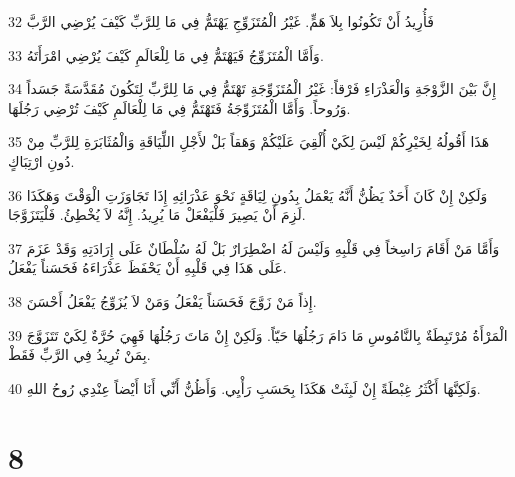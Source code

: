 \par 32 فَأُرِيدُ أَنْ تَكُونُوا بِلاَ هَمٍّ. غَيْرُ الْمُتَزَوِّجِ يَهْتَمُّ فِي مَا لِلرَّبِّ كَيْفَ يُرْضِي الرَّبَّ
\par 33 وَأَمَّا الْمُتَزَوِّجُ فَيَهْتَمُّ فِي مَا لِلْعَالَمِ كَيْفَ يُرْضِي امْرَأَتَهُ.
\par 34 إِنَّ بَيْنَ الزَّوْجَةِ وَالْعَذْرَاءِ فَرْقاً: غَيْرُ الْمُتَزَوِّجَةِ تَهْتَمُّ فِي مَا لِلرَّبِّ لِتَكُونَ مُقَدَّسَةً جَسَداً وَرُوحاً. وَأَمَّا الْمُتَزَوِّجَةُ فَتَهْتَمُّ فِي مَا لِلْعَالَمِ كَيْفَ تُرْضِي رَجُلَهَا.
\par 35 هَذَا أَقُولُهُ لِخَيْرِكُمْ لَيْسَ لِكَيْ أُلْقِيَ عَلَيْكُمْ وَهَقاً بَلْ لأَجْلِ اللِّيَاقَةِ وَالْمُثَابَرَةِ لِلرَّبِّ مِنْ دُونِ ارْتِبَاكٍ.
\par 36 وَلَكِنْ إِنْ كَانَ أَحَدٌ يَظُنُّ أَنَّهُ يَعْمَلُ بِدُونِ لِيَاقَةٍ نَحْوَ عَذْرَائِهِ إِذَا تَجَاوَزَتِ الْوَقْتَ وَهَكَذَا لَزِمَ أَنْ يَصِيرَ فَلْيَفْعَلْ مَا يُرِيدُ. إِنَّهُ لاَ يُخْطِئُ. فَلْيَتَزَوَّجَا.
\par 37 وَأَمَّا مَنْ أَقَامَ رَاسِخاً فِي قَلْبِهِ وَلَيْسَ لَهُ اضْطِرَارٌ بَلْ لَهُ سُلْطَانٌ عَلَى إِرَادَتِهِ وَقَدْ عَزَمَ عَلَى هَذَا فِي قَلْبِهِ أَنْ يَحْفَظَ عَذْرَاءَهُ فَحَسَناً يَفْعَلُ.
\par 38 إِذاً مَنْ زَوَّجَ فَحَسَناً يَفْعَلُ وَمَنْ لاَ يُزَوِّجُ يَفْعَلُ أَحْسَنَ.
\par 39 الْمَرْأَةُ مُرْتَبِطَةٌ بِالنَّامُوسِ مَا دَامَ رَجُلُهَا حَيّاً. وَلَكِنْ إِنْ مَاتَ رَجُلُهَا فَهِيَ حُرَّةٌ لِكَيْ تَتَزَوَّجَ بِمَنْ تُرِيدُ فِي الرَّبِّ فَقَطْ.
\par 40 وَلَكِنَّهَا أَكْثَرُ غِبْطَةً إِنْ لَبِثَتْ هَكَذَا بِحَسَبِ رَأْيِي. وَأَظُنُّ أَنِّي أَنَا أَيْضاً عِنْدِي رُوحُ اللهِ.

\chapter{8}

